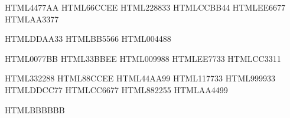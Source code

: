 \definecolor{TolBriBlue}   {HTML}{4477AA}
\definecolor{TolBriCyan}   {HTML}{66CCEE}
\definecolor{TolBriGreen}  {HTML}{228833}
\definecolor{TolBriYellow} {HTML}{CCBB44}
\definecolor{TolBriRed}    {HTML}{EE6677}
\definecolor{TolBriPurple} {HTML}{AA3377}

\definecolor{TolHCYellow}  {HTML}{DDAA33}
\definecolor{TolHCRed}     {HTML}{BB5566}
\definecolor{TolHCBlue}    {HTML}{004488}

\definecolor{TolVibBlue}   {HTML}{0077BB}
\definecolor{TolVibCyan}   {HTML}{33BBEE}
\definecolor{TolVibTeal}   {HTML}{009988}
\definecolor{TolVibOrange} {HTML}{EE7733}
\definecolor{TolVibRed}    {HTML}{CC3311}

\definecolor{TolMutIndigo} {HTML}{332288}
\definecolor{TolMutCyan}   {HTML}{88CCEE}
\definecolor{TolMutTeal}   {HTML}{44AA99}
\definecolor{TolMutGreen}  {HTML}{117733}
\definecolor{TolMutOlive}  {HTML}{999933}
\definecolor{TolMutSand}   {HTML}{DDCC77}
\definecolor{TolMutRose}   {HTML}{CC6677}
\definecolor{TolMutWine}   {HTML}{882255}
\definecolor{TolMutPurple} {HTML}{AA4499}

\definecolor{TolGray}      {HTML}{BBBBBB}
